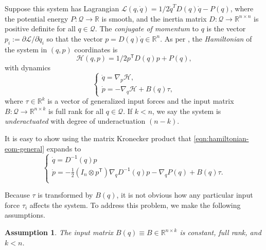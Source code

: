 \documentclass[journal,twoside,web]{ieeecolor}
\newtheorem{assm}{Assumption} %
\newcommand*{\tpose}{^\mathsf{T}}
\newcommand*{\inv}{^\mathsf{-1}}
\newcommand*{\R}{\mathbb{R}}
\newcommand*{\Id}[1]{I_{#1}}
\begin{document}
Suppose this system has Lagrangian
\(\mathcal{L}(q,\dot{q}) = 1/2 \dot{q}^T D(q) \dot{q} - P(q)\),
where the potential energy 
\(P : \mathcal{Q} \rightarrow \mathbb{R}\) 
is smooth, and the inertia matrix 
\(D : \mathcal{Q} \rightarrow \mathbb{R}^{n \times n}\)
is positive definite for all \(q \in \mathcal{Q}\).
The \textit{conjugate of momentum} to \(q\) is the vector
\(p_i := \partial\mathcal{L}/\partial\dot{q}_i\) so that the vector 
\(p = D(q)\dot{q} \in \R^n\).
As per \cite{landau_mechanics}, 
the \textit{Hamiltonian} of the system in \((q,p)\) coordinates
is
\begin{equation}\label{eqn:hamiltonian}
    \mathcal{H}(q,p) = 1/2 p\tpose D(q) p + P(q)
    ,
\end{equation}
with dynamics
\begin{equation}\label{eqn:hamiltonian-eom-general}
    \begin{cases}
        \dot{q} = \nabla_p\mathcal{H} 
        , \\
        \dot{p} = -\nabla_q\mathcal{H} + B(q) \tau
        ,
    \end{cases}
\end{equation}
where \(\tau \in \R^k\) is a vector of generalized input forces and the input
matrix \(B : \mathcal{Q} \rightarrow \R^{n \times k}\) is full rank for all 
\(q \in \mathcal{Q}\).
If \(k < n\), we say the system is \textit{underactuated} with degree of
underactuation \((n-k)\).

It is easy to show using the matrix Kronecker product that
\eqref{eqn:hamiltonian-eom-general} expands to
\begin{equation}\label{eqn:hamiltonian-full-dynamics}
     \begin{cases}
        \dot{q} = D\inv(q)p \\
        \dot{p} = -\frac{1}{2} (\Id{n} \otimes p\tpose) \nabla_q D\inv(q) p
        - \nabla_q P(q) + B(q) \tau
        . \\
    \end{cases}
\end{equation}

Because \(\tau\) is transformed by \(B(q)\), it is not obvious how any
particular input force \(\tau_i\) affects the system.
To address this problem, we make the following assumptions.

\begin{assm}\label{assm:B-const}
    The input matrix \(B(q) \equiv B \in \R^{n\times k}\) is constant,
    full rank, and \(k < n\).
\end{assm}
\end{document}
